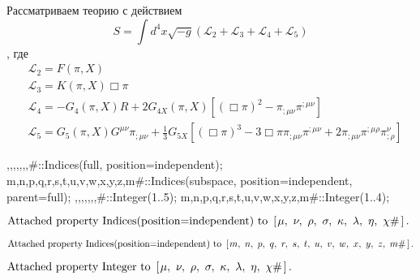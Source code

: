 \documentclass[12pt,a4paper,svgnames]{extarticle}
\newcommand\brwrap[3]{%
  \setbox0=\hbox{$#2$}
  \left#1\vbox to \the\ht0{\hbox to 0pt{}}\right.\kern-.2em
  \begingroup #2\endgroup\kern-.15em
  \left.\vbox to \the\ht0{\hbox to 0pt{}}\right#3
}
\begin{document}
Рассматриваем теорию с действием
\begin{equation}
	S = \int d^4x\sqrt{-g}\left(\mathcal{L}_{2}+\mathcal{L}_{3}+\mathcal{L}_{4}+\mathcal{L}_{5}\right)
\end{equation}
, где
\begin{align}
	& \mathcal{L}_{2} = F\left(\pi, X\right)\\
	& \mathcal{L}_{3} = K\left(\pi, X\right) \Box\pi\\
	& \mathcal{L}_{4} = -G_4(\pi,X)R + 2G_{4X}\left(\pi, X\right)\left[\left(\Box\pi\right)^2 - \pi_{;\mu\nu}\pi^{;\mu\nu}\right]\\
	&\mathcal{L}_{5} = G_5\left(\pi, X\right) G^{\mu\nu}\pi_{;\mu\nu} + \frac{1}{3} G_{5X}\left[\left(\Box\pi\right)^{3} - 3\Box\pi\pi_{;\mu\nu}\pi^{;\mu\nu}+2\pi_{;\mu\nu}\pi^{;\mu\rho}\pi^{\nu}_{;\rho}\right]
\end{align}
\begin{python}
{\mu,\nu,\rho,\sigma,\kappa,\lambda,\eta,\chi#}::Indices(full, position=independent);
{m,n,p,q,r,s,t,u,v,w,x,y,z,m#}::Indices(subspace, position=independent, parent=full);
{\mu,\nu,\rho,\sigma,\kappa,\lambda,\eta,\chi#}::Integer(1..5);
{m,n,p,q,r,s,t,u,v,w,x,y,z,m#}::Integer(1..4);
\end{python}
\begin{adjustwidth}{1em}{0cm}${}\text{Attached property Indices(position=independent) to~}\brwrap{[}{\mu,~\discretionary{}{}{} \nu,~\discretionary{}{}{} \rho,~\discretionary{}{}{} \sigma,~\discretionary{}{}{} \kappa,~\discretionary{}{}{} \lambda,~\discretionary{}{}{} \eta,~\discretionary{}{}{} \chi\#}{]}.$\end{adjustwidth}
\begin{adjustwidth}{1em}{0cm}${}\text{Attached property Indices(position=independent) to~}\brwrap{[}{m,~\discretionary{}{}{} n,~\discretionary{}{}{} p,~\discretionary{}{}{} q,~\discretionary{}{}{} r,~\discretionary{}{}{} s,~\discretionary{}{}{} t,~\discretionary{}{}{} u,~\discretionary{}{}{} v,~\discretionary{}{}{} w,~\discretionary{}{}{} x,~\discretionary{}{}{} y,~\discretionary{}{}{} z,~\discretionary{}{}{} m\#}{]}.$\end{adjustwidth}
\begin{adjustwidth}{1em}{0cm}${}\text{Attached property Integer to~}\brwrap{[}{\mu,~\discretionary{}{}{} \nu,~\discretionary{}{}{} \rho,~\discretionary{}{}{} \sigma,~\discretionary{}{}{} \kappa,~\discretionary{}{}{} \lambda,~\discretionary{}{}{} \eta,~\discretionary{}{}{} \chi\#}{]}.$\end{adjustwidth}
\end{document}
